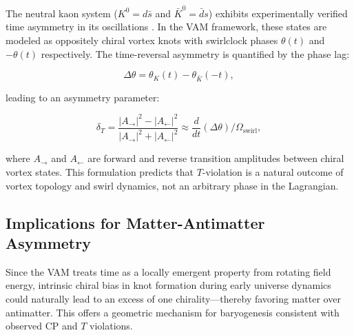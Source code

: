 The neutral kaon system ($K^0 = d\bar{s}$ and $\bar{K}^0 = \bar{d}s$) exhibits experimentally verified time asymmetry in its oscillations \cite{christenson1964evidence, cplear1998tviolation}. In the VAM framework, these states are modeled as oppositely chiral vortex knots with swirlclock phases $\theta(t)$ and $-\theta(t)$ respectively. The time-reversal asymmetry is quantified by the phase lag:

\begin{equation}
\Delta \theta = \theta_K(t) - \theta_{\bar{K}}(-t),
\end{equation}

leading to an asymmetry parameter:

\begin{equation}
\delta_T = \frac{|A_{\rightarrow}|^2 - |A_{\leftarrow}|^2}{|A_{\rightarrow}|^2 + |A_{\leftarrow}|^2} \approx \frac{d}{dt} (\Delta \theta) \Big/ \Omega_{\text{swirl}},
\end{equation}

where $A_{\rightarrow}$ and $A_{\leftarrow}$ are forward and reverse transition amplitudes between chiral vortex states. This formulation predicts that $T$-violation is a natural outcome of vortex topology and swirl dynamics, not an arbitrary phase in the Lagrangian.

\subsection{Implications for Matter-Antimatter Asymmetry}

Since the VAM treats time as a locally emergent property from rotating field energy, intrinsic chiral bias in knot formation during early universe dynamics could naturally lead to an excess of one chirality—thereby favoring matter over antimatter. This offers a geometric mechanism for baryogenesis consistent with observed CP and $T$ violations.

